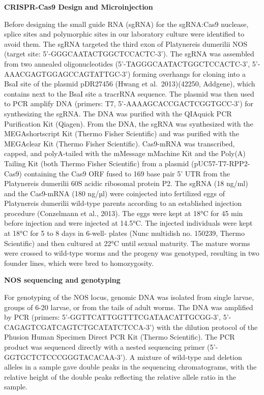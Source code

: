 \documentclass[
  10pt,
  onecolumn]{article}
\begin{document}
\textbf{CRISPR-Cas9 Design and Microinjection}

Before designing the small guide RNA (sgRNA) for the sgRNA:Cas9
nuclease, splice sites and polymorphic sites in our laboratory culture
were identified to avoid them. The sgRNA targeted the third exon of
Platynereis dumerilii NOS (target site: 5'-GGGCAATACTGGCTCCACTC-3'). The
sgRNA was assembled from two annealed oligonucleotides
(5'-TAGGGCAATACTGGCTCCACTC-3', 5'-AAACGAGTGGAGCCAGTATTGC-3') forming
overhangs for cloning into a BsaI site of the plasmid pDR27456 (Hwang et
al.~2013)(42250, Addgene), which contains next to the BsaI site a
tracrRNA sequence. The plasmid was then used to PCR amplify DNA
(primers: T7, 5'-AAAAGCACCGACTCGGTGCC-3') for synthesizing the sgRNA.
The DNA was purified with the QIAquick PCR Purification Kit (Qiagen).
From the DNA, the sgRNA was synthesized with the MEGAshortscript Kit
(Thermo Fisher Scientific) and was purified with the MEGAclear Kit
(Thermo Fisher Scientific). Cas9-mRNA was transcribed, capped, and
polyA-tailed with the mMessage mMachine Kit and the Poly(A) Tailing Kit
(both Thermo Fisher Scientific) from a plasmid (pUC57-T7-RPP2-Cas9)
containing the Cas9 ORF fused to 169 base pair 5' UTR from the
Platynereis dumerilii 60S acidic ribosomal protein P2. The sgRNA (18
ng/ml) and the Cas9-mRNA (180 ng/µl) were coinjected into fertilized
eggs of Platynereis dumerilii wild-type parents according to an
established injection procedure (Conzelmann et al., 2013). The eggs were
kept at 18°C for 45 min before injection and were injected at 14.5°C.
The injected individuals were kept at 18°C for 5 to 8 days in 6-well-
plates (Nunc multidish no. 150239, Thermo Scientific) and then cultured
at 22°C until sexual maturity. The mature worms were crossed to
wild-type worms and the progeny was genotyped, resulting in two founder
lines, which were bred to homozygosity.

\textbf{NOS sequencing and genotyping}

For genotyping of the NOS locus, genomic DNA was isolated from single
larvae, groups of 6-20 larvae, or from the tails of adult worms. The DNA
was amplified by PCR (primers: 5'-GGTTCATTGGTTTCGATAACATTGCGG-3',
5'-CAGAGTCGATCAGTCTGCATATCTCCA-3') with the dilution protocol of the
Phusion Human Specimen Direct PCR Kit (Thermo Scientific). The PCR
product was sequenced directly with a nested sequencing primer
(5'-GGTGCTCTCCCGGGTACACAA-3'). A mixture of wild-type and deletion
alleles in a sample gave double peaks in the sequencing chromatograms,
with the relative height of the double peaks reflecting the relative
allele ratio in the sample.
\end{document}
